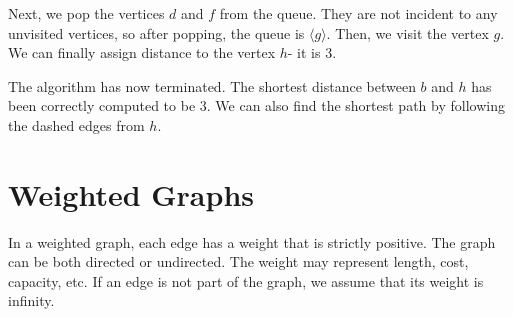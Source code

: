 \documentclass[a4paper, openany]{memoir}
\begin{document}
\noindent Next, we pop the vertices $d$ and $f$ from the queue. They are not incident to any unvisited vertices, so after popping, the queue is $\langle g \rangle$. Then, we visit the vertex $g$. We can finally assign distance to the vertex $h$- it is 3.
\begin{figure}[H]
    \centering
\end{figure}
\noindent The algorithm has now terminated. The shortest distance between $b$ and $h$ has been correctly computed to be 3. We can also find the shortest path by following the dashed edges from $h$.
\newpage

\section{Weighted Graphs}
In a weighted graph, each edge has a weight that is strictly positive. The graph can be both directed or undirected. The weight may represent length, cost, capacity, etc. If an edge is not part of the graph, we assume that its weight is infinity.
\end{document}
